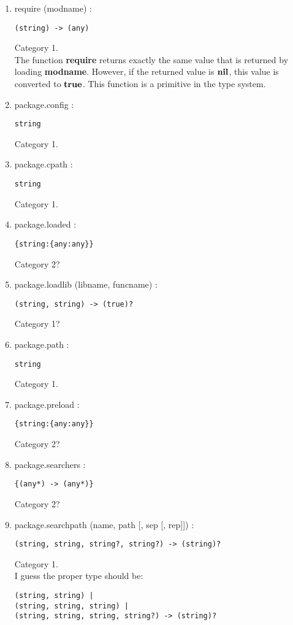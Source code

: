 \begin{enumerate}
\item require (modname) :
\begin{verbatim}
(string) -> (any)
\end{verbatim}
Category 1.
\\
The function \textbf{require} returns exactly the same value that is
returned by loading \textbf{modname}.
However, if the returned value is $\mathbf{nil}$, this value is
converted to $\mathbf{true}$.
This function is a primitive in the type system.
\item package.config :
\begin{verbatim}
string
\end{verbatim}
Category 1.
\item package.cpath :
\begin{verbatim}
string
\end{verbatim}
Category 1.
\item package.loaded :
\begin{verbatim}
{string:{any:any}}
\end{verbatim}
Category 2?
\item package.loadlib (libname, funcname) :
\begin{verbatim}
(string, string) -> (true)?
\end{verbatim}
Category 1?
\item package.path :
\begin{verbatim}
string
\end{verbatim}
Category 1.
\item package.preload :
\begin{verbatim}
{string:{any:any}}
\end{verbatim}
Category 2?
\item package.searchers :
\begin{verbatim}
{(any*) -> (any*)}
\end{verbatim}
Category 2?
\item package.searchpath (name, path [, sep [, rep]]) :
\begin{verbatim}
(string, string, string?, string?) -> (string)?
\end{verbatim}
Category 1.
\\
I guess the proper type should be:
\begin{verbatim}
(string, string) |
(string, string, string) |
(string, string, string, string?) -> (string)?
\end{verbatim}
\end{enumerate}

